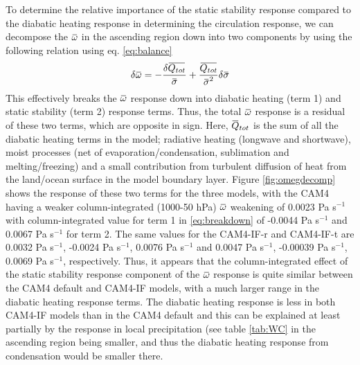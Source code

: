 \documentclass[letterpaper,12pt,titlepage,oneside,final]{book}
\newcommand{\overbar}[1]{\mkern 1.5mu\overline{\mkern-1.5mu#1\mkern-1.5mu}\mkern 1.5mu}
\begin{document}
To determine the relative importance of the static stability response compared to the diabatic heating response in determining the circulation response, we can decompose the $\overbar{\omega}$ in the ascending region down into two components by using the following relation using eq. \ref{eq:balance} \citep{yanai_determination_1973,li_strengthening_2015} 
\begin{align}\label{eq:breakdown}
\delta{\overbar{\omega}}=-\frac{\delta{\overbar{Q_{tot}}}}{\overbar{\sigma}}+\frac{\overbar{Q_{tot}}}{{\overbar{\sigma}}^{2}}\delta{\overbar{\sigma}}
\end{align}
This effectively breaks the $\overbar{\omega}$ response down into diabatic heating (term 1) and static stability (term 2) response terms. Thus, the total $\overbar{\omega}$ response is a residual of these two terms, which are opposite in sign. Here, $\overbar{Q}_{tot}$ is the sum of all the diabatic heating terms in the model; radiative heating (longwave and shortwave), moist processes (net of evaporation/condensation, sublimation and melting/freezing) and a small contribution from turbulent diffusion of heat from the land/ocean surface in the model boundary layer.  Figure \ref{fig:omegdecomp} shows the response of these two terms for the three models, with the CAM4 having a weaker column-integrated (1000-50 hPa) $\overbar{\omega}$ weakening of 0.0023 Pa s$^{-1}$ with column-integrated value for term 1 in \ref{eq:breakdown} of -0.0044 Pa s$^{-1}$ and 0.0067 Pa s$^{-1}$ for term 2. The same values for the CAM4-IF-r and CAM4-IF-t are 0.0032 Pa s$^{-1}$, -0.0024 Pa s$^{-1}$, 0.0076 Pa s$^{-1}$ and 0.0047 Pa s$^{-1}$, -0.00039 Pa s$^{-1}$, 0.0069 Pa s$^{-1}$, respectively. Thus, it appears that the column-integrated effect of the static stability response component of the $\overbar{\omega}$ response is quite similar between the CAM4 default and CAM4-IF models, with a much larger range in the diabatic heating response terms. The diabatic heating response is less in both CAM4-IF models than in the CAM4 default and this can be explained at least partially by the response in local precipitation (see table \ref{tab:WC} in the ascending region being smaller, and thus the diabatic heating response from condensation would be smaller there.
\end{document}
